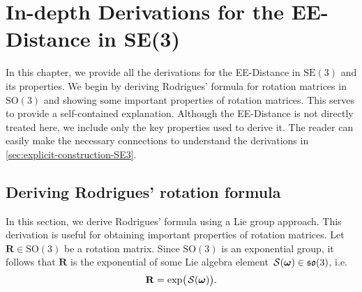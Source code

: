 \chapter{In-depth Derivations for the EE-Distance in SE(3)}\label{app:rodrigues-formula}
In this chapter, we provide all the derivations for the EE-Distance in $\text{SE}(3)$ and its properties. We begin by deriving Rodrigues' formula for rotation matrices in $\text{SO}(3)$ and showing some important properties of rotation matrices. This serves to provide a self-contained explanation. Although the EE-Distance is not directly treated here, we include only the key properties used to derive it. The reader can easily make the necessary connections to understand the derivations in \cref{sec:explicit-construction-SE3}.
\section{Deriving Rodrigues' rotation formula}
In this section, we derive Rodrigues' formula using a Lie group approach. This derivation is useful for obtaining important properties of rotation matrices. Let $\mathbf{R}\in\text{SO}(3)$ be a rotation matrix. Since $\text{SO}(3)$ is an exponential group, it follows that $\mathbf{R}$ is the exponential of some Lie algebra element $\SL[\boldsymbol{\omega}]\in\mathfrak{so}(3)$, i.e.
\begin{align}
    \mathbf{R} = \exp\bigl(\SL[\boldsymbol{\omega}]\bigr).
\end{align}


